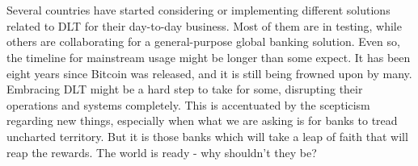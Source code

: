 \documentclass[12pt,twoside]{article}
\begin{document}
\\ \\
Several countries have started considering or implementing different solutions related to DLT for their day-to-day business. Most of them are in testing, while others are collaborating for a general-purpose global banking solution. Even so, the timeline for mainstream usage might be longer than some expect. It has been eight years since Bitcoin was released, and it is still being frowned upon by many. Embracing DLT might be a hard step to take for some, disrupting their operations and systems completely. This is accentuated by the scepticism regarding new things, especially when what we are asking is for banks to tread uncharted territory. But it is those banks which will take a leap of faith that will reap the rewards. The world is ready - why shouldn't they be?
\newpage


\end{document}
